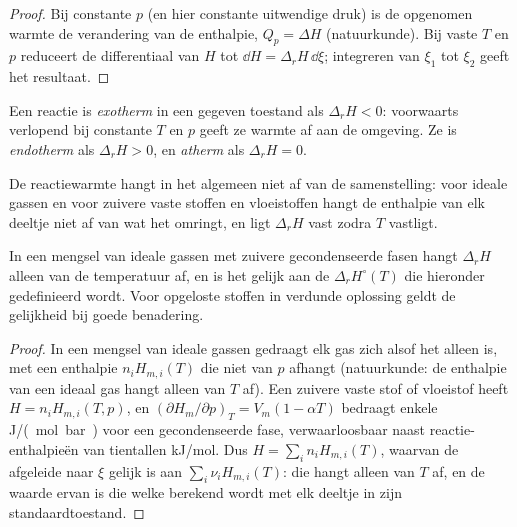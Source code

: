 \begin{proof}
Bij constante $p$ (en hier constante uitwendige druk) is de opgenomen warmte
de verandering van de enthalpie, $Q_p = \Delta H$ (natuurkunde). Bij vaste $T$ en $p$
reduceert de differentiaal van $H$ tot $\dd H = \Delta_r H\,\dd\xi$; integreren
van $\xi_1$ tot $\xi_2$ geeft het resultaat.
\end{proof}

\begin{definition}\label{def:b2:reaction-enthalpy:exothermic}
Een reactie is \emph{exotherm} in een gegeven toestand als
$\Delta_r H < 0$: voorwaarts verlopend bij constante $T$ en $p$ geeft ze warmte af aan de
omgeving. Ze is \emph{endotherm} als $\Delta_r H >
0$, en \emph{atherm} als $\Delta_r H = 0$.
\end{definition}

De reactiewarmte hangt in het algemeen niet af van de samenstelling:
voor ideale gassen en voor zuivere vaste stoffen en vloeistoffen hangt de enthalpie van elk
deeltje niet af van wat het omringt, en ligt $\Delta_r H$ vast
zodra $T$ vastligt.

\begin{proposition}\label{prop:b2:reaction-enthalpy:ideal}
In een mengsel van ideale gassen met zuivere gecondenseerde fasen hangt $\Delta_r H$
alleen van de temperatuur af, en is het gelijk aan de 
$\Delta_r H^\circ(T)$ die hieronder gedefinieerd wordt. Voor opgeloste stoffen in verdunde
oplossing geldt de gelijkheid bij goede benadering.
\end{proposition}

\begin{proof}
In een mengsel van ideale gassen gedraagt elk gas zich alsof het alleen is, met een enthalpie
$n_iH_{m,i}(T)$ die niet van $p$ afhangt (natuurkunde: de enthalpie van een
ideaal gas hangt alleen van $T$ af). Een zuivere vaste stof of vloeistof heeft $H = n_iH_{m,i}(T,
p)$, en $(\partial H_m/\partial p)_T = V_m(1 - \alpha T)$ bedraagt enkele
\unit{J/(mol.bar)} voor een gecondenseerde fase, verwaarloosbaar naast reactie-enthalpieën
van tientallen \unit{kJ/mol}. Dus $H = \sum_in_iH_{m,i}(T)$, waarvan de
afgeleide naar $\xi$ gelijk is aan $\sum_i\nu_iH_{m,i}(T)$: die hangt alleen van
$T$ af, en de waarde ervan is die welke berekend wordt met elk deeltje in zijn
standaardtoestand.
\end{proof}

